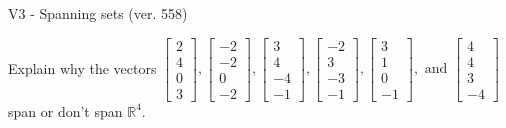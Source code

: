 \begin{exercise}
  \begin{exerciseTitle}V3 - Spanning sets (ver. 558)\end{exerciseTitle}
  \begin{exerciseStatement}
    Explain why the vectors \(\left[\begin{array}{r}
2 \\
4 \\
0 \\
3
\end{array}\right] , \left[\begin{array}{r}
-2 \\
-2 \\
0 \\
-2
\end{array}\right] , \left[\begin{array}{r}
3 \\
4 \\
-4 \\
-1
\end{array}\right] , \left[\begin{array}{r}
-2 \\
3 \\
-3 \\
-1
\end{array}\right] , \left[\begin{array}{r}
3 \\
1 \\
0 \\
-1
\end{array}\right] , \text{ and } \left[\begin{array}{r}
4 \\
4 \\
3 \\
-4
\end{array}\right]\) span or don't span \(\mathbb{R}^4\). 
	



\end{exerciseStatement}
\end{exercise}
